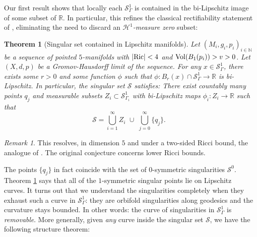 \documentclass[11pt,reqno]{amsart}
\numberwithin{equation}{section}
\newcommand{\RR}{\mathds{R}}
\newcommand{\Ric}{{\rm Ric}}
\newcommand{\Vol}{{\rm Vol}}
\newcommand{\cS}{\mathcal{S}}
\newtheorem{theorem}[thm]{Theorem}
\theoremstyle{definition}
\theoremstyle{remark}
\newtheorem{remark}[thm]{Remark}
\begin{document}
Our first result shows that locally each $\cS^1_{\Gamma}$ is contained in the bi-Lipschitz image of some subset of $\RR$. In particular, this refines the classical rectifiability statement of \cite{cjn,jn}, eliminating the need to discard an \emph{$\mathcal{H}^{1}$-measure zero} subset:

\begin{theorem}[Singular set contained in Lipschitz manifolds]\label{thm:lips curve sing}
    Let $(M_i,g_i, p_i)_{i\in\mathbb{N}}$ be a sequence of pointed $5$-manifolds with $|\Ric|< 4$ and $\Vol(B_1(p_i)) > v >0$. Let $(X,d,p)$ be a Gromov-Hausdorff limit of the sequence. For any $x\in \cS^1_{\Gamma}$, there exists some $r>0$ and some function $\phi$ such that $\phi:B_{r}(x) \cap \cS^1_{\Gamma} \to \RR$ is bi-Lipschitz. In particular, the singular set $\cS$ satisfies: There exist countably many points $q_j$ and measurable subsets $Z_i \subset \cS^1_{\Gamma_i}$  with bi-Lipschitz maps $\phi_i: Z_i \to \RR$ such that 
    \begin{equation}
        \cS = \bigcup_{i=1}^{\infty} Z_i \,\,\cup\,\, \bigcup_{j=0}^{\infty} \{q_j\}. 
    \end{equation}
\end{theorem}

{
\begin{remark}
    This resolves, in dimension $5$ and under a two-sided Ricci bound, the analogue of \cite[Conjecture 2.15]{nab20}. The original conjecture concerns lower Ricci bounds.
\end{remark}
}

 






The points $\{q_j\}$ in fact coincide with the set of $0$-symmetric singularities $\cS^0$. Theorem \ref{thm:lips curve sing} says that all of the $1$-symmetric singular points lie on Lipschitz curves. It turns out that we understand the singularities completely when they exhaust such a curve in $\cS^1_{\Gamma}$: they are orbifold singularities along geodesics and the curvature stays bounded. In other words: the curve of singularities in $\cS^1_{\Gamma}$ is \emph{removable}. More generally, given \emph{any} curve inside the singular set $\cS$, we have the following structure theorem:
\end{document}
